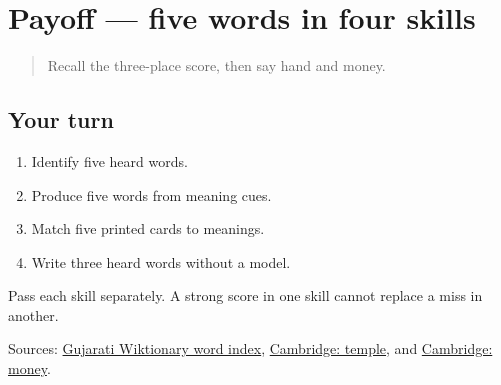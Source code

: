 \section[\texorpdfstring{\gu{બજાર} — \gu{ઘર} — \gu{મંદિર} … (bajār — ghar …)}{બજાર — ઘર — મંદિર … (bajār — ghar …)}]{Payoff — five words in four skills}

\label{lesson:GU-C21-travel-five}



\begin{quote}
Recall the three-place score, then say hand and money.
\end{quote}

\subsection*{Your turn}
\begin{enumerate}
\raggedright
  \item Identify five heard words.
  \item Produce five words from meaning cues.
  \item Match five printed cards to meanings.
  \item Write three heard words without a model.
\end{enumerate}

Pass each skill separately. A strong score in one skill cannot replace a miss in another.

\begin{tcolorbox}[breakable,colback=teal!4,colframe=teal!35!black,title={Before you move on}]
Sources: \href{https://gu.wiktionary.org/wiki/\%E0\%AA\%B5\%E0\%AA\%BF\%E0\%AA\%95\%E0\%AA\%BF\%E0\%AA\%95\%E0\%AB\%8B\%E0\%AA\%B6:\%E0\%AA\%B6\%E0\%AA\%AC\%E0\%AB\%8D\%E0\%AA\%A6\_\%E0\%AA\%85\%E0\%AA\%A8\%E0\%AB\%81\%E0\%AA\%95\%E0\%AB\%8D\%E0\%AA\%B0\%E0\%AA\%AE\%E0\%AA\%A3\%E0\%AA\%BF\%E0\%AA\%95\%E0\%AA\%BE}{Gujarati Wiktionary word index}, \href{https://dictionary.cambridge.org/dictionary/english-gujarati/temple}{Cambridge: temple}, and \href{https://dictionary.cambridge.org/dictionary/english-gujarati/money}{Cambridge: money}.
\end{tcolorbox}
